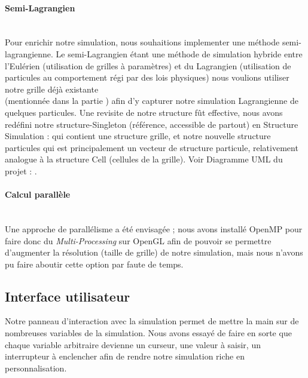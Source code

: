 \documentclass[a4paper]{article}
\begin{document}
\paragraph{Semi-Lagrangien}
\leavevmode\\

Pour enrichir notre simulation, nous souhaitions implementer une méthode semi-lagrangienne. Le semi-Lagrangien étant une méthode 
de simulation hybride entre l'Eulérien (utilisation de grilles à paramètres) et du Lagrangien (utilisation de particules au comportement 
régi par des lois physiques) nous voulions utiliser notre grille déjà existante\\ (mentionnée dans la partie 
\underline{\emph{}}) afin d'y capturer 
notre simulation Lagrangienne de quelques particules. Une revisite de notre structure fût effective, nous avons redéfini notre 
structure-Singleton (référence, accessible de partout) en Structure Simulation : qui contient une structure grille, et notre nouvelle structure 
particules qui est principalement un vecteur de structure particule, relativement analogue à la structure Cell 
(cellules de la grille). Voir Diagramme UML du projet : \underline{\emph{}}.

\paragraph{Calcul parallèle}
\leavevmode\\

Une approche de parallélisme a été envisagée ; nous avons installé OpenMP pour faire donc du \emph{Multi-Processing} sur OpenGL afin de pouvoir se permettre d'augmenter la résolution (taille de grille) de notre simulation, mais nous n'avons pu faire aboutir cette option par faute de temps.


\subsection{Interface utilisateur}
\label{sec:interface-utilisateur}

\hspace*{\parindent} Notre panneau d'interaction avec la simulation permet de mettre la main sur 
    de nombreuses variables de la simulation. 
    Nous avons essayé de faire en sorte que chaque variable arbitraire devienne un curseur, une 
    valeur à saisir, un interrupteur à enclencher afin de rendre notre simulation riche en 
    personnalisation. 
    
\end{document}
